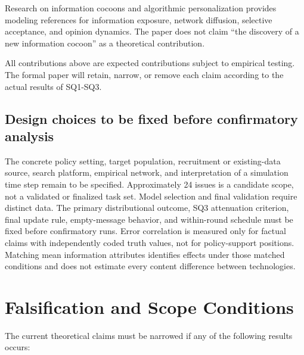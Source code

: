 \documentclass[11pt,a4paper]{article}
\begin{document}
Research on information cocoons and algorithmic personalization provides modeling references for information exposure, network diffusion, selective acceptance, and opinion dynamics. The paper does not claim ``the discovery of a new information cocoon'' as a theoretical contribution.

All contributions above are expected contributions subject to empirical testing. The formal paper will retain, narrow, or remove each claim according to the actual results of SQ1-SQ3.

\subsection{Design choices to be fixed before confirmatory analysis}

The concrete policy setting, target population, recruitment or existing-data source, search platform, empirical network, and interpretation of a simulation time step remain to be specified. Approximately 24 issues is a candidate scope, not a validated or finalized task set. Model selection and final validation require distinct data. The primary distributional outcome, SQ3 attenuation criterion, final update rule, empty-message behavior, and within-round schedule must be fixed before confirmatory runs. Error correlation is measured only for factual claims with independently coded truth values, not for policy-support positions. Matching mean information attributes identifies effects under those matched conditions and does not estimate every content difference between technologies.

\section{Falsification and Scope Conditions}

The current theoretical claims must be narrowed if any of the following results occurs:
\end{document}
